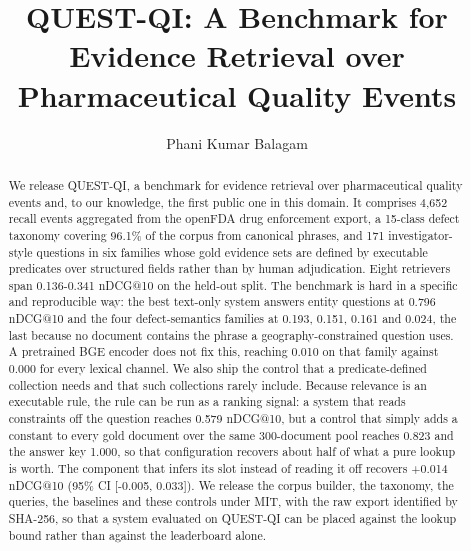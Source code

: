 \documentclass[runningheads]{llncs}
\begin{document}
\title{QUEST-QI: A Benchmark for Evidence Retrieval over Pharmaceutical Quality Events}
\author{Phani Kumar Balagam}

\maketitle

\begin{abstract}
We release QUEST-QI, a benchmark for evidence retrieval over pharmaceutical quality events and, to our knowledge, the first public one in this domain. It comprises 4,652 recall events aggregated from the openFDA drug enforcement export, a 15-class defect taxonomy covering 96.1\% of the corpus from canonical phrases, and 171 investigator-style questions in six families whose gold evidence sets are defined by executable predicates over structured fields rather than by human adjudication. Eight retrievers span 0.136-0.341 nDCG@10 on the held-out split. The benchmark is hard in a specific and reproducible way: the best text-only system answers entity questions at 0.796 nDCG@10 and the four defect-semantics families at 0.193, 0.151, 0.161 and 0.024, the last because no document contains the phrase a geography-constrained question uses. A pretrained BGE encoder does not fix this, reaching 0.010 on that family against 0.000 for every lexical channel. We also ship the control that a predicate-defined collection needs and that such collections rarely include. Because relevance is an executable rule, the rule can be run as a ranking signal: a system that reads constraints off the question reaches 0.579 nDCG@10, but a control that simply adds a constant to every gold document over the same 300-document pool reaches 0.823 and the answer key 1.000, so that configuration recovers about half of what a pure lookup is worth. The component that infers its slot instead of reading it off recovers +0.014 nDCG@10 (95\% CI [-0.005, 0.033]). We release the corpus builder, the taxonomy, the queries, the baselines and these controls under MIT, with the raw export identified by SHA-256, so that a system evaluated on QUEST-QI can be placed against the lookup bound rather than against the leaderboard alone.
\end{abstract}
\end{document}
